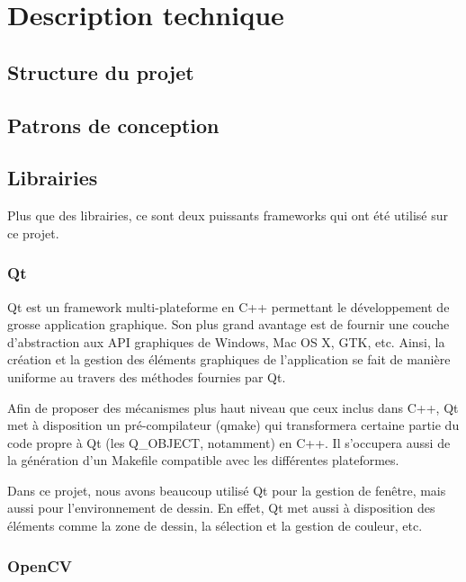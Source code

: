\documentclass[11pt,a4paper,oldfontcommands]{memoir}
\begin{document}

\chapter{Description technique}

\section{Structure du projet}

\section{Patrons de conception}

\section{Librairies}

Plus que des librairies, ce sont deux puissants frameworks qui ont été utilisé sur ce projet. 

\subsection{Qt}

Qt est un framework multi-plateforme en C++ permettant le développement de grosse application graphique. Son plus grand avantage est de fournir une couche d'abstraction aux API graphiques de Windows, Mac OS X, GTK, etc. Ainsi, la création et la gestion des éléments graphiques de l'application se fait de manière uniforme au travers des méthodes fournies par Qt.

Afin de proposer des mécanismes plus haut niveau que ceux inclus dans C++, Qt met à disposition un pré-compilateur (qmake) qui transformera certaine partie du code propre à Qt (les Q\_OBJECT, notamment) en C++. Il s'occupera aussi de la génération d'un Makefile compatible avec les différentes plateformes.

Dans ce projet, nous avons beaucoup utilisé Qt pour la gestion de fenêtre, mais aussi pour l'environnement de dessin. En effet, Qt met aussi à disposition des éléments comme la zone de dessin, la sélection et la gestion de couleur, etc.

\subsection{OpenCV}
\end{document}
